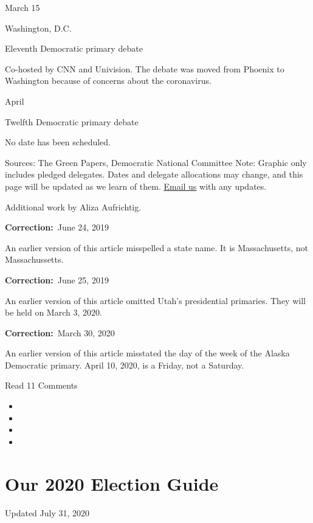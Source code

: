 March 15

Washington, D.C.

Eleventh Democratic primary debate

Co-hosted by CNN and Univision. The debate was moved from Phoenix to
Washington because of concerns about the coronavirus.

April

Twelfth Democratic primary debate

No date has been scheduled.

Sources: The Green Papers, Democratic National Committee \textbar{}
Note: Graphic only includes pledged delegates. Dates and delegate
allocations may change, and this page will be updated as we learn of
them. \href{mailto:election@nytimes.com}{Email us} with any updates.

Additional work by Aliza Aufrichtig.

\textbf{Correction:}~June 24, 2019

An earlier version of this article misspelled a state name. It is
Massachusetts, not Massachussetts.

\textbf{Correction:}~June 25, 2019

An earlier version of this article omitted Utah's presidential
primaries. They will be held on March 3, 2020.

\textbf{Correction:}~March 30, 2020

An earlier version of this article misstated the day of the week of the
Alaska Democratic primary. April 10, 2020, is a Friday, not a Saturday.

Read 11 Comments

\begin{itemize}
\item
\item
\item
\item
\end{itemize}

\hypertarget{our-2020-election-guide}{%
\section{Our 2020 Election Guide}\label{our-2020-election-guide}}

Updated July 31, 2020

